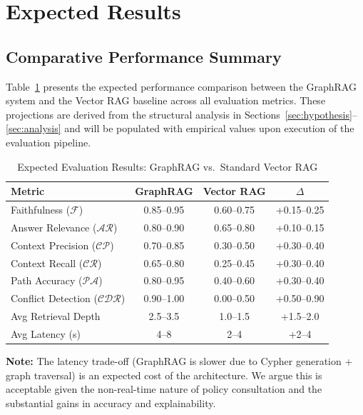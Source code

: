 \section{Expected Results}
\label{sec:results}

\subsection{Comparative Performance Summary}

Table~\ref{tab:results} presents the expected performance comparison between the GraphRAG system and the Vector RAG baseline across all evaluation metrics. These projections are derived from the structural analysis in Sections~\ref{sec:hypothesis}--\ref{sec:analysis} and will be populated with empirical values upon execution of the evaluation pipeline.

\begin{table}[htbp]
\centering
\caption{Expected Evaluation Results: GraphRAG vs.\ Standard Vector RAG}
\label{tab:results}
\begin{tabular}{lccc}
\toprule
\textbf{Metric} & \textbf{GraphRAG} & \textbf{Vector RAG} & \textbf{$\Delta$} \\
\midrule
Faithfulness ($\mathcal{F}$)          & 0.85--0.95 & 0.60--0.75 & +0.15--0.25 \\
Answer Relevance ($\mathcal{AR}$)     & 0.80--0.90 & 0.65--0.80 & +0.10--0.15 \\
Context Precision ($\mathcal{CP}$)    & 0.70--0.85 & 0.30--0.50 & +0.30--0.40 \\
Context Recall ($\mathcal{CR}$)       & 0.65--0.80 & 0.25--0.45 & +0.30--0.40 \\
Path Accuracy ($\mathcal{PA}$)        & 0.80--0.95 & 0.40--0.60 & +0.30--0.40 \\
Conflict Detection ($\mathcal{CDR}$)  & 0.90--1.00 & 0.00--0.50 & +0.50--0.90 \\
\midrule
Avg Retrieval Depth                   & 2.5--3.5   & 1.0--1.5   & +1.5--2.0 \\
Avg Latency (s)                       & 4--8       & 2--4       & +2--4 \\
\bottomrule
\end{tabular}
\end{table}

\textbf{Note:} The latency trade-off (GraphRAG is slower due to Cypher generation + graph traversal) is an expected cost of the architecture. We argue this is acceptable given the non-real-time nature of policy consultation and the substantial gains in accuracy and explainability.

